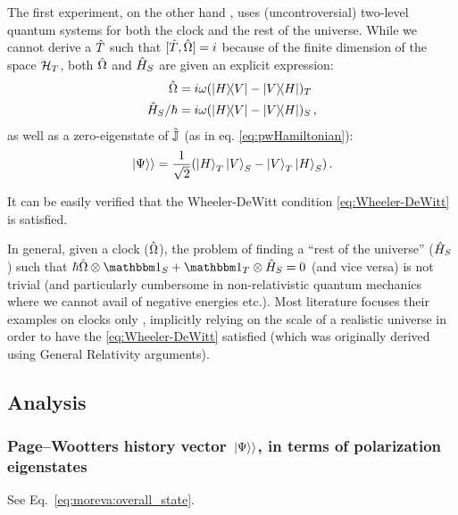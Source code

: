 The first experiment, on the other hand \parencite{Moreva:illustration,Moreva:synthetic},
uses (uncontroversial)
two-level quantum systems for both the clock and the rest of the universe.
While we cannot derive a $\hat{T}$ such that $[\hat{T}, \hat{\Omega}] = i$
because of the finite dimension of the space $\mathcal{H}_T$, both $\hat{\Omega}$
and $\hat{H}_S$ are given an explicit expression:
\begin{align}
  \hat{\Omega}            &= i\omega(\ketbra{H}{V}- \ketbra{V}{H})_T \label{eq:MorevaOmegaT}\\
  \hat{H}_S/{\hbar}       &= i\omega(\ketbra{H}{V}- \ketbra{V}{H})_S \label{eq:MorevaH_S}
  \,\text{,}
\end{align}
as well as a zero-eigenstate of $\hat{\mathbb{J}}$ (as in eq. \ref{eq:pwHamiltonian}):
\begin{equation}\label{eq:moreva:overall_state}
  \left.\left| \Psi \right\rangle\right\rangle = \frac{1}{\sqrt{2}}\qty(\ket{H}_T\ket{V}_S-\ket{V}_T\ket{H}_S)
  \,\text{.}
\end{equation}

It can be easily verified that the Wheeler-DeWitt condition
\eqref{eq:Wheeler-DeWitt} is satisfied.

In general, given a clock ($\hat{\Omega}$), the problem of finding a
``rest of the universe'' ($\hat{H}_S$) such that
$\hbar\op{\Omega}\ox\idop_S + \idop_T\ox\op{H}_S = 0$
(and vice versa)
is not trivial
(and particularly cumbersome in non-relativistic
quantum mechanics where we cannot avail of negative energies etc.).
Most literature focuses their examples on clocks only
\parencite{Prvanovic,RealisticClocks,HarmonicClocks},
implicitly relying on the scale of a realistic universe
in order to have the \eqref{eq:Wheeler-DeWitt} satisfied
(which was originally derived using General Relativity arguments).

\subsection{Analysis}

\subsubsection*{Page--Wootters history vector $\left.\left| \Psi \right\rangle\right\rangle$, in terms of polarization eigenstates}

See Eq.~\eqref{eq:moreva:overall_state}.

